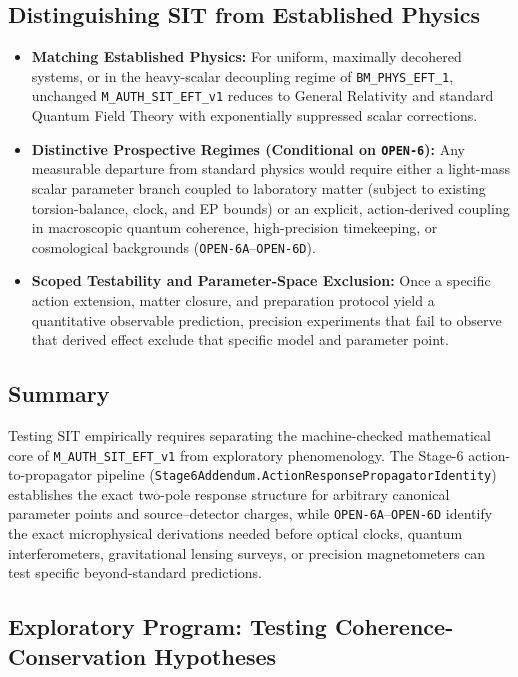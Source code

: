 \subsection{Distinguishing SIT from Established Physics}

\begin{itemize}
    \item \textbf{Matching Established Physics:}  
    For uniform, maximally decohered systems, or in the heavy-scalar decoupling regime of \texttt{BM\_PHYS\_EFT\_1}, unchanged \texttt{M\_AUTH\_SIT\_EFT\_v1} reduces to General Relativity and standard Quantum Field Theory with exponentially suppressed scalar corrections.
    \item \textbf{Distinctive Prospective Regimes (Conditional on \texttt{OPEN-6}):}  
    Any measurable departure from standard physics would require either a light-mass scalar parameter branch coupled to laboratory matter (subject to existing torsion-balance, clock, and EP bounds) or an explicit, action-derived coupling in macroscopic quantum coherence, high-precision timekeeping, or cosmological backgrounds (\texttt{OPEN-6A}--\texttt{OPEN-6D}).
    \item \textbf{Scoped Testability and Parameter-Space Exclusion:}  
    Once a specific action extension, matter closure, and preparation protocol yield a quantitative observable prediction, precision experiments that fail to observe that derived effect exclude that specific model and parameter point.
\end{itemize}

\subsection{Summary}

Testing SIT empirically requires separating the machine-checked mathematical core of \texttt{M\_AUTH\_SIT\_EFT\_v1} from exploratory phenomenology. The Stage-6 action-to-propagator pipeline (\texttt{Stage6Addendum.\allowbreak{}ActionResponsePropagatorIdentity}) establishes the exact two-pole response structure for arbitrary canonical parameter points and source--detector charges, while \texttt{OPEN-6A}--\texttt{OPEN-6D} identify the exact microphysical derivations needed before optical clocks, quantum interferometers, gravitational lensing surveys, or precision magnetometers can test specific beyond-standard predictions.

\subsection{Exploratory Program: Testing Coherence-Conservation Hypotheses}
\label{sec:falsifiability_coherence_conservation}

